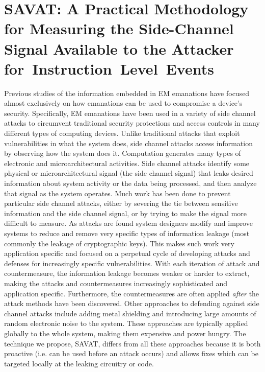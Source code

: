 
\section{SAVAT: A Practical Methodology for Measuring the Side-Channel Signal Available to the Attacker for~Instruction~Level~Events}

Previous studies of the information embedded in EM emanations have focused almost exclusively on how emanations can be used to compromise a device's security. Specifically, EM emanations have been used in a variety of side channel attacks to circumvent traditional security protections and access controls in many different types of computing devices. Unlike traditional attacks that exploit vulnerabilities in what the system does, side channel attacks access information by observing how the system does it. Computation generates many types of electronic and microarchitectural activities. Side channel attacks identify some physical or microarchitectural signal (\ie the side channel signal) that leaks desired information about system activity or the data being processed, and then analyze that signal as the system operates. Much work has been done to prevent particular side channel attacks, either by severing the tie between sensitive information and the side channel signal, or by trying to make the signal more difficult to measure. As attacks are found system designers modify and improve systems to reduce and remove very specific types of information leakage (most commonly the leakage of cryptographic keys). This makes such work very application specific and focused on a perpetual cycle of developing attacks and defenses for increasingly specific vulnerabilities. With each iteration of attack and countermeasure, the information leakage becomes weaker or harder to extract, making the attacks and countermeasures increasingly sophisticated and application specific. Furthermore, the countermeasures are often applied \textit{after} the attack methods have been discovered. Other approaches to defending against side channel attacks include adding metal shielding and introducing large amounts of random electronic noise to the system. These approaches are typically applied globally to the whole system, making them expensive and power hungry. The technique we propose, SAVAT, differs from all these approaches because it is both proactive (i.e. can be used before an attack occurs) and allows fixes which can be targeted locally at the leaking circuitry or code. 

